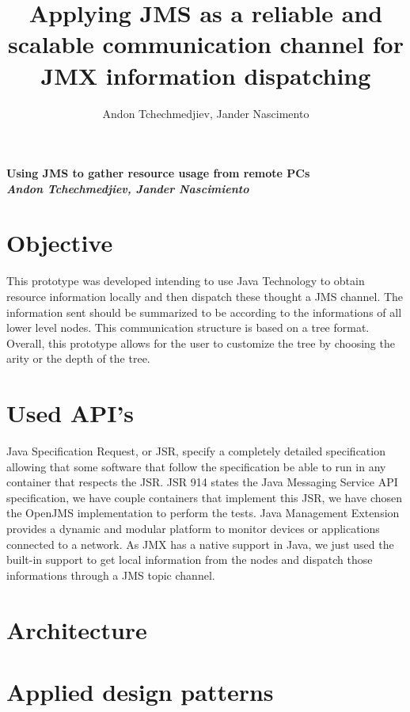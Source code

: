 \documentclass{article} %
\title {Applying JMS as a reliable and scalable communication channel for JMX information dispatching}
\author{Andon Tchechmedjiev, Jander Nascimento}
\begin{document}
{\Large {\bf Using JMS to gather resource usage from remote PCs}} \\
{\large {\bf {\it Andon Tchechmedjiev, Jander Nascimiento}}}
\section{Objective}
This prototype was developed intending to use Java Technology to obtain resource information locally and then dispatch these thought a JMS channel.
The information sent should be summarized to be according to the informations of all lower level nodes.
This communication structure is based on a tree format.
Overall, this prototype allows for the user to customize the tree by choosing the arity or the depth of the tree.

\section{Used API's}

Java Specification Request, or JSR, specify a completely detailed specification allowing that some software that follow the specification be able to run in any container that respects the JSR.
JSR 914 states the Java Messaging Service API specification, we have couple containers that implement this JSR, we have chosen the OpenJMS implementation to perform the tests.
Java Management Extension provides a dynamic and modular platform to monitor devices or applications connected to a network.
As JMX has a native support in Java, we just used the built-in support to get local information from the nodes and dispatch those informations through a JMS topic channel. 

\section{Architecture}
\section{Applied design patterns}
\end{document}
